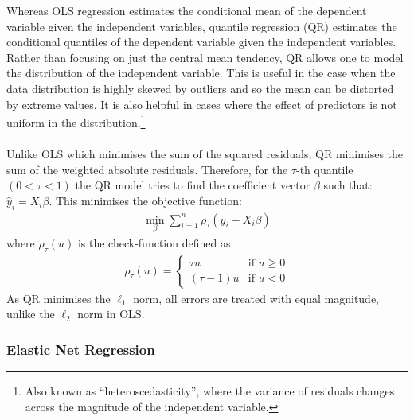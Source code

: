 \documentclass[12pt,twoside]{report}
\begin{document}
Whereas OLS regression estimates the conditional mean of the dependent variable given the independent variables, quantile regression (QR) estimates the conditional quantiles of the dependent variable given the independent variables. Rather than focusing on just the central mean tendency, QR allows one to model the distribution of the independent variable. This is useful in the case when the data distribution is highly skewed by outliers and so the mean can be distorted by extreme values. It is also helpful in cases where the effect of predictors is not uniform in the distribution.\footnote{Also known as ``heteroscedasticity'', where the variance of residuals changes across the magnitude of the independent variable.} 
\\\\
Unlike OLS which minimises the sum of the squared residuals, QR minimises the sum of the weighted absolute residuals. Therefore, for the $\tau$-th quantile $(0 < \tau < 1)$ the QR model tries to find the coefficient vector $\beta$ such that: $\hat{y}_{i} = X_{i}\beta$. This minimises the objective function:
\begin{align}
    \min_{\beta} \sum_{i=1}^{n} \rho_\tau(y_i - X_i\beta)
\end{align}
where $\rho_\tau(u)$ is the check-function defined as:
\begin{align}
    \rho_\tau(u) = \begin{cases} 
    \tau u & \text{if } u \geq 0 \\
    (\tau - 1) u & \text{if } u < 0 
    \end{cases}
\end{align}
As QR minimises the $\ell_1$ norm, all errors are treated with equal magnitude, unlike the $\ell_2$ norm in OLS.


\subsubsection{Elastic Net Regression}
\end{document}
